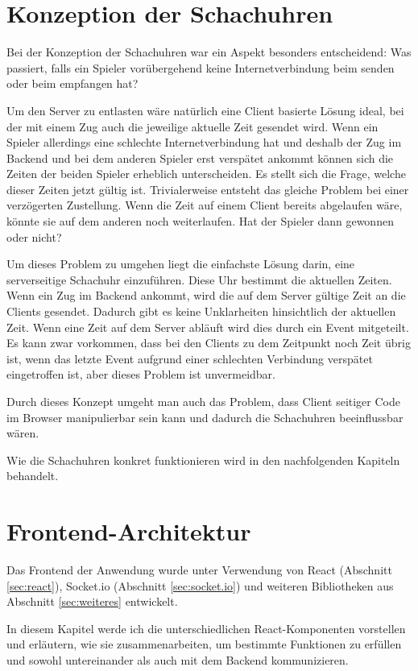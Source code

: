 \section{Konzeption der Schachuhren}
Bei der Konzeption der Schachuhren war ein Aspekt besonders entscheidend: Was passiert, falls ein Spieler vorübergehend keine Internetverbindung beim senden oder beim empfangen hat?

Um den Server zu entlasten wäre natürlich eine Client basierte Lösung ideal, bei der mit einem Zug auch die jeweilige aktuelle Zeit gesendet wird. Wenn ein Spieler allerdings eine schlechte Internetverbindung hat und deshalb der Zug im Backend und bei dem anderen Spieler erst verspätet ankommt können sich die Zeiten der beiden Spieler erheblich unterscheiden. Es stellt sich die Frage, welche dieser Zeiten jetzt gültig ist. Trivialerweise entsteht das gleiche Problem bei einer verzögerten Zustellung. Wenn die Zeit auf einem Client bereits abgelaufen wäre, könnte sie auf dem anderen noch weiterlaufen. Hat der Spieler dann gewonnen oder nicht?

Um dieses Problem zu umgehen liegt die einfachste Lösung darin, eine serverseitige Schachuhr einzuführen. Diese Uhr bestimmt die aktuellen Zeiten. Wenn ein Zug im Backend ankommt, wird die auf dem Server gültige Zeit an die Clients gesendet. Dadurch gibt es keine Unklarheiten hinsichtlich der aktuellen Zeit. Wenn eine Zeit auf dem Server abläuft wird dies durch ein Event mitgeteilt.  Es kann zwar vorkommen, dass bei den Clients zu dem Zeitpunkt noch Zeit übrig ist, wenn das letzte Event aufgrund einer schlechten Verbindung verspätet eingetroffen ist, aber dieses Problem ist unvermeidbar.

Durch dieses Konzept umgeht man auch das Problem, dass Client seitiger Code im Browser manipulierbar sein kann und dadurch die Schachuhren beeinflussbar wären.

Wie die Schachuhren konkret funktionieren wird in den nachfolgenden Kapiteln behandelt.

    \section{Frontend-Architektur}
Das Frontend der Anwendung wurde unter Verwendung von React (Abschnitt \ref{sec:react}), Socket.io (Abschnitt \ref{sec:socket.io}) und weiteren Bibliotheken aus Abschnitt \ref{sec:weiteres} entwickelt.



In diesem Kapitel werde ich die unterschiedlichen React-Komponenten vorstellen und erläutern, wie sie zusammenarbeiten, um bestimmte Funktionen zu erfüllen und sowohl untereinander als auch mit dem Backend kommunizieren.

